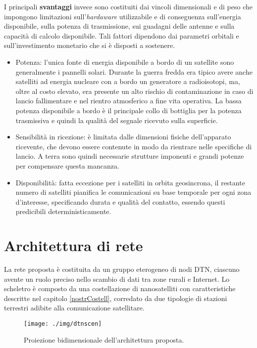 \documentclass[12pt,a4paper,oneside]{book}
\begin{document}
			I principali {\bf svantaggi} invece sono costituiti dai vincoli dimensionali e di peso che impongono limitazioni sull'\textit{hardaware} utilizzabile e di conseguenza sull'energia disponibile, sulla potenza di trasmissione, sui guadagni delle antenne e sulla capacità di calcolo disponibile. Tali fattori dipendono dai parametri orbitali e sull'investimento monetario che si è disposti a sostenere. 
			\begin{itemize}
				\item Potenza: l'unica fonte di energia disponibile a bordo di un satellite sono generalmente i pannelli solari. Durante la guerra fredda era tipico avere anche satelliti ad energia nucleare con a bordo un generatore a radioisotopi, ma, oltre al costo elevato, era presente un alto rischio di contaminazione in caso di lancio fallimentare e nel rientro atmosferico a fine vita operativa.
				La bassa potenza disponibile a bordo è il principale collo di bottiglia per la potenza trasmissiva e quindi la qualità del segnale ricevuto sulla superficie. 
				\item Sensibilità in ricezione: è limitata dalle dimensioni fisiche dell'apparato ricevente, che devono essere contenute in modo da rientrare nelle specifiche di lancio. A terra sono quindi necessarie strutture imponenti e grandi potenze per compensare questa mancanza. 
				\item Disponibilità: fatta eccezione per i satelliti in orbita geosincrona, il restante numero di satelliti pianifica le comunicazioni su base temporale per ogni zona d'interesse, specificando durata e qualità del contatto, essendo questi predicibili deterministicamente.			
			\end{itemize}
			
			
		
		\section{Architettura di rete}	\label{archRete}
		
		La rete proposta è costituita da un gruppo eterogeneo di nodi DTN, ciascuno avente un ruolo preciso nello scambio di dati tra zone rurali e Internet. Lo scheletro è composto da una costellazione di nanosatelliti con caratteristiche descritte nel capitolo \ref{nostrCostell}, corredato da due tipologie di stazioni terrestri adibite alla comunicazione satellitare. 
		\begin{figure}[h]
			\centering
			\texttt{[image: ./img/dtnscen]}
			\caption{Proiezione bidimensionale dell'architettura proposta.}
			\label{fig:dtnscen}
		\end{figure}		
		
\end{document}
